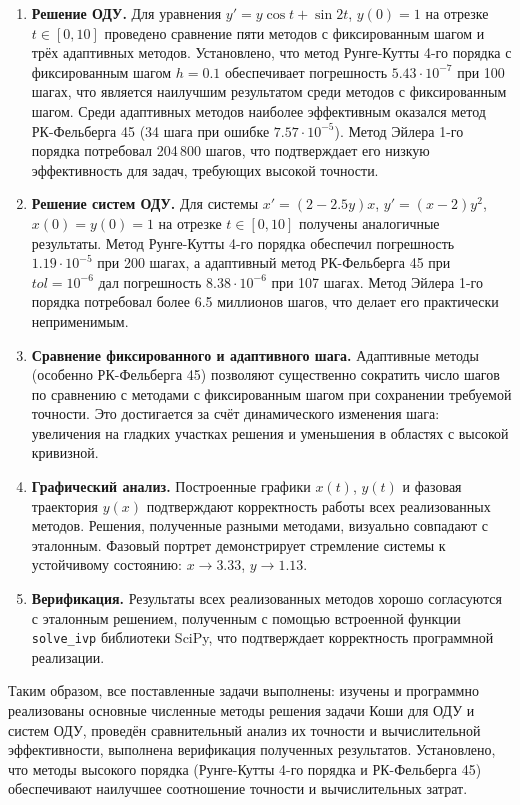 \documentclass[a4paper]{article}
\begin{document}
\begin{enumerate}
    \item \textbf{Решение ОДУ.} Для уравнения $y' = y\cos t + \sin 2t$, $y(0) = 1$ на отрезке $t \in [0, 10]$ проведено сравнение пяти методов с фиксированным шагом и трёх адаптивных методов. Установлено, что метод Рунге-Кутты 4-го порядка с фиксированным шагом $h = 0.1$ обеспечивает погрешность $5.43\cdot10^{-7}$ при 100 шагах, что является наилучшим результатом среди методов с фиксированным шагом. Среди адаптивных методов наиболее эффективным оказался метод РК-Фельберга 45 (34 шага при ошибке $7.57\cdot10^{-5}$). Метод Эйлера 1-го порядка потребовал 204\,800 шагов, что подтверждает его низкую эффективность для задач, требующих высокой точности.
    
    \item \textbf{Решение систем ОДУ.} Для системы $x' = (2 - 2.5y)x$, $y' = (x - 2)y^2$, $x(0) = y(0) = 1$ на отрезке $t \in [0, 10]$ получены аналогичные результаты. Метод Рунге-Кутты 4-го порядка обеспечил погрешность $1.19\cdot10^{-5}$ при 200 шагах, а адаптивный метод РК-Фельберга 45 при $tol = 10^{-6}$ дал погрешность $8.38\cdot10^{-6}$ при 107 шагах. Метод Эйлера 1-го порядка потребовал более 6.5 миллионов шагов, что делает его практически неприменимым.
    
    \item \textbf{Сравнение фиксированного и адаптивного шага.} Адаптивные методы (особенно РК-Фельберга 45) позволяют существенно сократить число шагов по сравнению с методами с фиксированным шагом при сохранении требуемой точности. Это достигается за счёт динамического изменения шага: увеличения на гладких участках решения и уменьшения в областях с высокой кривизной.
    
    \item \textbf{Графический анализ.} Построенные графики $x(t)$, $y(t)$ и фазовая траектория $y(x)$ подтверждают корректность работы всех реализованных методов. Решения, полученные разными методами, визуально совпадают с эталонным. Фазовый портрет демонстрирует стремление системы к устойчивому состоянию: $x \to 3.33$, $y \to 1.13$.
    
    \item \textbf{Верификация.} Результаты всех реализованных методов хорошо согласуются с эталонным решением, полученным с помощью встроенной функции \texttt{solve\_ivp} библиотеки SciPy, что подтверждает корректность программной реализации.
\end{enumerate}

Таким образом, все поставленные задачи выполнены: изучены и программно реализованы основные численные методы решения задачи Коши для ОДУ и систем ОДУ, проведён сравнительный анализ их точности и вычислительной эффективности, выполнена верификация полученных результатов. Установлено, что методы высокого порядка (Рунге-Кутты 4-го порядка и РК-Фельберга 45) обеспечивают наилучшее соотношение точности и вычислительных затрат.
\end{document}
